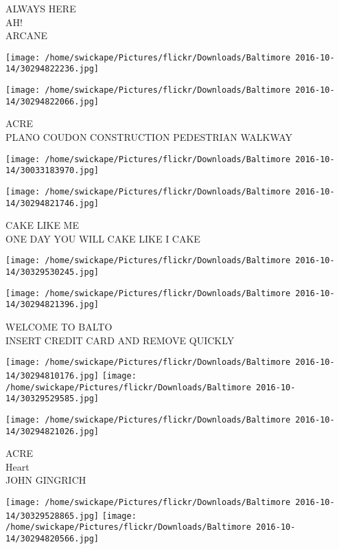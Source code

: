 \documentclass[10pt,letterpaper]{article}
\begin{document}
ALWAYS HERE\\
AH!\\
ARCANE\\
\pagebreak

\texttt{[image: /home/swickape/Pictures/flickr/Downloads/Baltimore 2016-10-14/30294822236.jpg]}

\vspace{0.25in}
\texttt{[image: /home/swickape/Pictures/flickr/Downloads/Baltimore 2016-10-14/30294822066.jpg]}

ACRE\\
PLANO COUDON CONSTRUCTION PEDESTRIAN WALKWAY\\
\pagebreak

\texttt{[image: /home/swickape/Pictures/flickr/Downloads/Baltimore 2016-10-14/30033183970.jpg]}

\vspace{0.25in}
\texttt{[image: /home/swickape/Pictures/flickr/Downloads/Baltimore 2016-10-14/30294821746.jpg]}

CAKE LIKE ME\\
ONE DAY YOU WILL CAKE LIKE I CAKE\\
\pagebreak

\texttt{[image: /home/swickape/Pictures/flickr/Downloads/Baltimore 2016-10-14/30329530245.jpg]}

\vspace{0.25in}
\texttt{[image: /home/swickape/Pictures/flickr/Downloads/Baltimore 2016-10-14/30294821396.jpg]}

WELCOME TO BALTO\\
INSERT CREDIT CARD AND REMOVE QUICKLY\\
\pagebreak

\texttt{[image: /home/swickape/Pictures/flickr/Downloads/Baltimore 2016-10-14/30294810176.jpg]}
\texttt{[image: /home/swickape/Pictures/flickr/Downloads/Baltimore 2016-10-14/30329529585.jpg]}

\vspace{0.25in}
\texttt{[image: /home/swickape/Pictures/flickr/Downloads/Baltimore 2016-10-14/30294821026.jpg]}

ACRE\\
Heart\\
JOHN GINGRICH\\
\pagebreak

\texttt{[image: /home/swickape/Pictures/flickr/Downloads/Baltimore 2016-10-14/30329528865.jpg]}
\texttt{[image: /home/swickape/Pictures/flickr/Downloads/Baltimore 2016-10-14/30294820566.jpg]}
\end{document}
